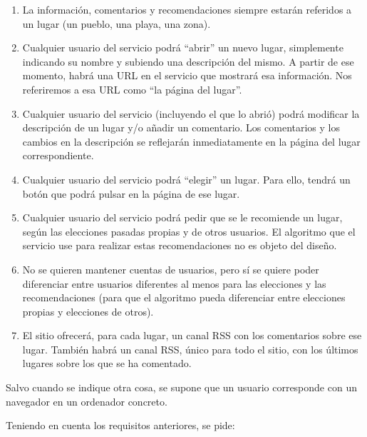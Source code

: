 \begin{enumerate}
\item La información, comentarios y recomendaciones siempre estarán referidos a un lugar (un pueblo, una playa, una zona).
\item Cualquier usuario del servicio podrá ``abrir'' un nuevo lugar, simplemente indicando su nombre y subiendo una descripción del mismo. A partir de ese momento, habrá una URL en el servicio que  mostrará esa información. Nos referiremos a esa URL como ``la página del lugar''.
\item Cualquier usuario del servicio (incluyendo el que lo abrió) podrá modificar la descripción de un lugar y/o añadir un comentario. Los comentarios y los cambios en la descripción se reflejarán inmediatamente en la página del lugar correspondiente.
\item Cualquier usuario del servicio podrá ``elegir'' un lugar. Para ello, tendrá un botón que podrá pulsar en la página de ese lugar.
\item Cualquier usuario del servicio podrá pedir que se le recomiende un lugar, según las elecciones pasadas propias y de otros usuarios. El algoritmo que el servicio use para realizar estas recomendaciones no es objeto del diseño.
\item No se quieren mantener cuentas de usuarios, pero sí se quiere poder diferenciar entre usuarios diferentes al menos para las elecciones y las recomendaciones (para que el algoritmo pueda diferenciar entre elecciones propias y elecciones de otros).
\item El sitio ofrecerá, para cada lugar, un canal RSS con los comentarios sobre ese lugar. También  habrá un canal RSS, único para todo el sitio, con los últimos lugares sobre los que se ha comentado.
\end{enumerate}

Salvo cuando se indique otra cosa, se supone que un usuario corresponde con un navegador en un ordenador concreto.

Teniendo en cuenta los requisitos anteriores, se pide:


